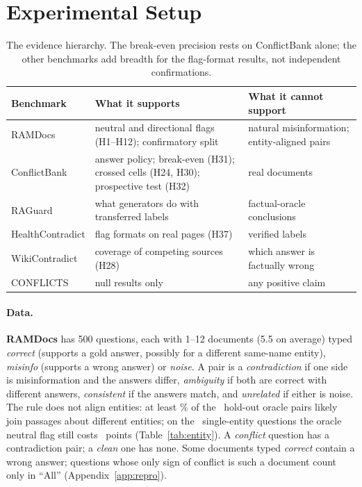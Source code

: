 \section{Experimental Setup}
\label{sec:setup}

\begin{table}[t]
\centering\scriptsize
\setlength{\tabcolsep}{3pt}
\begin{tabular}{@{}>{\raggedright\arraybackslash}p{1.45cm}>{\raggedright\arraybackslash}p{2.85cm}>{\raggedright\arraybackslash}p{2.75cm}@{}}
\toprule
Benchmark & What it supports & What it cannot support \\
\midrule
RAMDocs & neutral and directional flags (H1--H12); confirmatory split & natural misinformation; entity-aligned pairs \\
ConflictBank & answer policy; break-even (H31); crossed cells (H24, H30); prospective test (H32) & real documents \\
RAGuard & what generators do with transferred labels & factual-oracle conclusions \\
Health\-Contradict & flag formats on real pages (H37) & verified labels \\
WikiContradict & coverage of competing sources (H28) & which answer is factually wrong \\
CONFLICTS & null results only & any positive claim \\
\bottomrule
\end{tabular}
\caption{The evidence hierarchy. The break-even precision rests on ConflictBank alone; the other benchmarks add
breadth for the flag-format results, not independent confirmations.}
\label{tab:evidence}
\end{table}

\paragraph{Data.}
\textbf{RAMDocs} \citep{wang2025madam} has 500 questions, each with 1--12 documents (5.5 on average) typed
\emph{correct} (supports a gold answer, possibly for a different same-name entity), \emph{misinfo} (supports a wrong
answer) or \emph{noise}. A pair is a \emph{contradiction} if one side is misinformation and the answers differ,
\emph{ambiguity} if both are correct with different answers, \emph{consistent} if the answers match, and
\emph{unrelated} if either is noise. The rule does not align entities: at least \pairCrossLbShare\% of the \pairContraN\ hold-out
oracle pairs likely join passages about different entities; on the \pairSingleN\ single-entity questions the oracle
neutral flag still costs \aentNeuSingle\ points (Table~\ref{tab:entity}).
A \emph{conflict} question has a contradiction pair; a \emph{clean} one has none. Some documents typed \emph{correct} contain a wrong answer; questions whose only sign of
conflict is such a document count only in ``All'' (Appendix~\ref{app:repro}).


